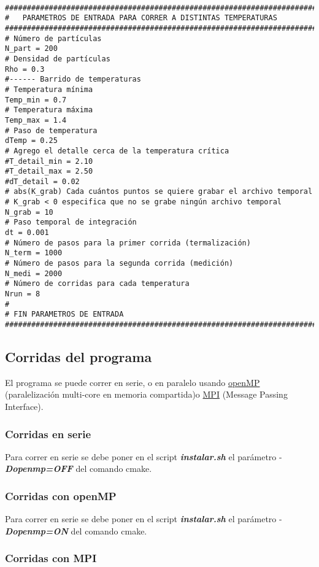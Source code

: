 \begin{verbatim}

###############################################################################       
#   PARAMETROS DE ENTRADA PARA CORRER A DISTINTAS TEMPERATURAS
###############################################################################
# Número de partículas
N_part = 200
# Densidad de partículas
Rho = 0.3
#------ Barrido de temperaturas
# Temperatura mínima
Temp_min = 0.7
# Temperatura máxima
Temp_max = 1.4
# Paso de temperatura
dTemp = 0.25
# Agrego el detalle cerca de la temperatura crítica
#T_detail_min = 2.10
#T_detail_max = 2.50
#dT_detail = 0.02
# abs(K_grab) Cada cuántos puntos se quiere grabar el archivo temporal
# K_grab < 0 especifica que no se grabe ningún archivo temporal
N_grab = 10
# Paso temporal de integración
dt = 0.001
# Número de pasos para la primer corrida (termalización)
N_term = 1000
# Número de pasos para la segunda corrida (medición)
N_medi = 2000
# Número de corridas para cada temperatura
Nrun = 8
#
# FIN PARAMETROS DE ENTRADA
###############################################################################

\end{verbatim}

\subsection{Corridas del programa}

El programa se puede correr en serie, o en paralelo usando  \href{http://openmp.org/}{openMP} 
(paralelización multi-core en memoria compartida)o  \href{http://www.open-mpi.org/}{MPI} (Message Passing Interface).

\subsubsection{Corridas en serie}
Para correr en serie se debe poner en el script \textbf{\textit{instalar.sh}}
el parámetro -\textbf{\textit{Dopenmp=OFF}} del comando cmake.

\subsubsection{Corridas con openMP}
Para correr en serie se debe poner en el script \textbf{\textit{instalar.sh}}
el parámetro -\textbf{\textit{Dopenmp=ON}} del comando cmake.

\subsubsection{Corridas con MPI}


